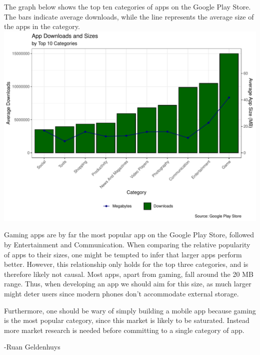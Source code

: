 \documentclass[11pt,preprint, authoryear]{elsarticle}
\numberwithin{equation}{section}
\numberwithin{figure}{section}
\numberwithin{table}{section}
\begin{document}
The graph below shows the top ten categories of apps on the Google Play
Store. The bars indicate average downloads, while the line represents
the average size of the apps in the category.
\includegraphics{Question5_files/figure-latex/unnamed-chunk-3-1.pdf}

Gaming apps are by far the most popular app on the Google Play Store,
followed by Entertainment and Communication. When comparing the relative
popularity of apps to their sizes, one might be tempted to infer that
larger apps perform better. However, this relationship only holds for
the top three categories, and is therefore likely not causal. Most apps,
apart from gaming, fall around the 20 MB range. Thus, when developing an
app we should aim for this size, as much larger might deter users since
modern phones don't accommodate external storage.

Furthermore, one should be wary of simply building a mobile app because
gaming is the most popular category, since this market is likely to be
saturated. Instead more market research is needed before committing to a
single category of app.

-Ruan Geldenhuys


\end{document}

